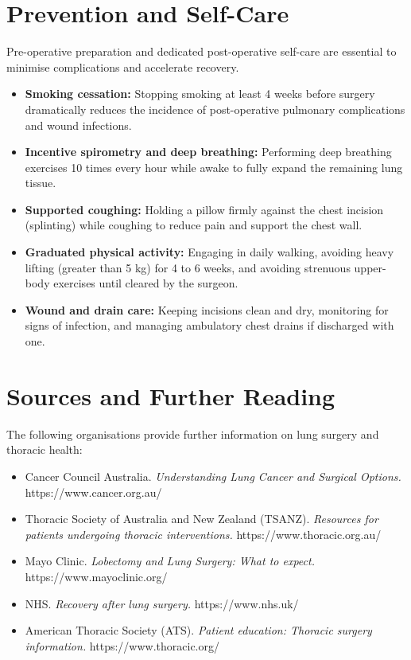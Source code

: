 \section*{Prevention and Self-Care}
Pre-operative preparation and dedicated post-operative self-care are essential to minimise complications and accelerate recovery.
\begin{itemize}
    \item \textbf{Smoking cessation:} Stopping smoking at least 4 weeks before surgery dramatically reduces the incidence of post-operative pulmonary complications and wound infections.
    \item \textbf{Incentive spirometry and deep breathing:} Performing deep breathing exercises 10 times every hour while awake to fully expand the remaining lung tissue.
    \item \textbf{Supported coughing:} Holding a pillow firmly against the chest incision (splinting) while coughing to reduce pain and support the chest wall.
    \item \textbf{Graduated physical activity:} Engaging in daily walking, avoiding heavy lifting (greater than 5 kg) for 4 to 6 weeks, and avoiding strenuous upper-body exercises until cleared by the surgeon.
    \item \textbf{Wound and drain care:} Keeping incisions clean and dry, monitoring for signs of infection, and managing ambulatory chest drains if discharged with one.
\end{itemize}

\section*{Sources and Further Reading}
The following organisations provide further information on lung surgery and thoracic health:
\begin{itemize}
    \item Cancer Council Australia. \textit{Understanding Lung Cancer and Surgical Options.} https://www.cancer.org.au/
    \item Thoracic Society of Australia and New Zealand (TSANZ). \textit{Resources for patients undergoing thoracic interventions.} https://www.thoracic.org.au/
    \item Mayo Clinic. \textit{Lobectomy and Lung Surgery: What to expect.} https://www.mayoclinic.org/
    \item NHS. \textit{Recovery after lung surgery.} https://www.nhs.uk/
    \item American Thoracic Society (ATS). \textit{Patient education: Thoracic surgery information.} https://www.thoracic.org/
\end{itemize}
